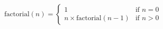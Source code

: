 \documentclass[preview]{standalone}
\begin{document}
\begin{align*}
\text{factorial}(n) = \begin{cases}1 & \text{if } n = 0 \\n \times \text{factorial}(n-1) & \text{if } n > 0\end{cases}
\end{align*}
\end{document}
